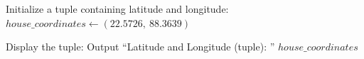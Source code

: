\begin{algorithm}
\caption{Store and Display Geographic Coordinates Using a Tuple}
\begin{algorithmic}[1]

\STATE Initialize a tuple containing latitude and longitude:
\STATE $house\_coordinates \gets (22.5726,\ 88.3639)$

\STATE Display the tuple:
\STATE Output ``Latitude and Longitude (tuple): '' $house\_coordinates$

\end{algorithmic}
\end{algorithm}